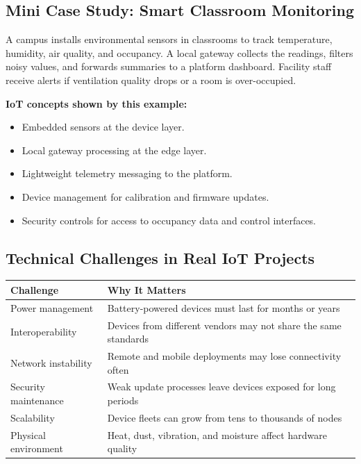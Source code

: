 \documentclass[11pt,a4paper]{article}
\begin{document}
\subsection{Mini Case Study: Smart Classroom Monitoring}

\begin{examplebox}[Scenario]
A campus installs environmental sensors in classrooms to track temperature, humidity, air quality, and occupancy. A local gateway collects the readings, filters noisy values, and forwards summaries to a platform dashboard. Facility staff receive alerts if ventilation quality drops or a room is over-occupied.
\end{examplebox}

\textbf{IoT concepts shown by this example:}
\begin{itemize}[leftmargin=*]
  \item Embedded sensors at the device layer.
  \item Local gateway processing at the edge layer.
  \item Lightweight telemetry messaging to the platform.
  \item Device management for calibration and firmware updates.
  \item Security controls for access to occupancy data and control interfaces.
\end{itemize}

\subsection{Technical Challenges in Real IoT Projects}

\begin{longtable}{p{5.8cm}p{5.8cm}}
\toprule
\textbf{Challenge} & \textbf{Why It Matters} \\
\midrule
Power management & Battery-powered devices must last for months or years \\
Interoperability & Devices from different vendors may not share the same standards \\
Network instability & Remote and mobile deployments may lose connectivity often \\
Security maintenance & Weak update processes leave devices exposed for long periods \\
Scalability & Device fleets can grow from tens to thousands of nodes \\
Physical environment & Heat, dust, vibration, and moisture affect hardware quality \\
\bottomrule
\end{longtable}
\end{document}
